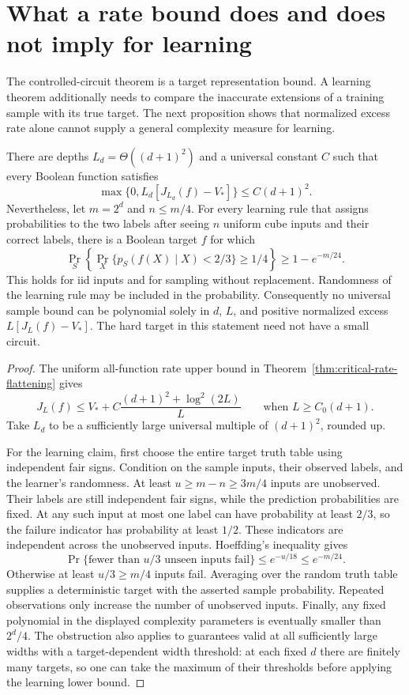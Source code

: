 \section{What a rate bound does and does not imply for learning}
\label{sec:critical-learning-comparison}

The controlled-circuit theorem is a target representation bound. A
learning theorem additionally needs to compare the inaccurate extensions
of a training sample with its true target. The next proposition shows
that normalized excess rate alone cannot supply a general complexity
measure for learning.

\begin{proposition}
\label{prop:critical-action-learning-obstruction}
There are depths $L_d=\Theta((d+1)^2)$ and a universal constant $C$
such that every Boolean function satisfies
\[
 \max\{0,L_d[J_{L_d}(f)-V_*]\}\le C(d+1)^2.
\]
Nevertheless, let $m=2^d$ and $n\le m/4$. For every learning rule
that assigns probabilities to the two labels after seeing $n$ uniform
cube inputs and their correct labels, there is a Boolean target $f$
for which
\[
 \Pr_S\!\left\{
   \Pr_X\{p_S(f(X)\mid X)<2/3\}\ge1/4
 \right\}\ge1-e^{-m/24}.
\]
This holds for iid inputs and for sampling without replacement.
Randomness of the learning rule may be included in the probability.
Consequently no universal sample bound can be polynomial solely in
$d$, $L$, and positive normalized excess $L[J_L(f)-V_*]$.
The hard target in this statement need not have a small circuit.
\end{proposition}

\begin{proof}
The uniform all-function rate upper bound in
Theorem~\ref{thm:critical-rate-flattening} gives
\[
 J_L(f)\le V_*+C\frac{(d+1)^2+\log^2(2L)}L
 \qquad\text{when }L\ge C_0(d+1).
\]
Take $L_d$ to be a sufficiently large universal multiple of
$(d+1)^2$, rounded up.

For the learning claim, first choose the entire target truth table
using independent fair signs. Condition on the sample inputs, their
observed labels, and the learner's randomness. At least
$u\ge m-n\ge3m/4$ inputs are unobserved. Their labels are still
independent fair signs, while the prediction probabilities are fixed.
At any such input at most one label can have probability at least
$2/3$, so the failure indicator has probability at least $1/2$.
These indicators are independent across the unobserved inputs.
Hoeffding's inequality gives
\[
 \Pr\{\text{fewer than }u/3\text{ unseen inputs fail}\}
 \le e^{-u/18}\le e^{-m/24}.
\]
Otherwise at least $u/3\ge m/4$ inputs fail. Averaging over the
random truth table supplies a deterministic target with the asserted
sample probability. Repeated observations only increase the number
of unobserved inputs. Finally, any fixed polynomial in the displayed
complexity parameters is eventually smaller than $2^d/4$.
The obstruction also applies to guarantees valid at all sufficiently
large widths with a target-dependent width threshold: at each fixed
$d$ there are finitely many targets, so one can take the maximum of
their thresholds before applying the learning lower bound.
\end{proof}

